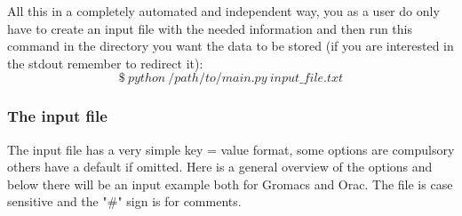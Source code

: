 		All this in a completely automated and independent way, you as a user do only have to create an input file with the needed information and then run this command in the directory you want the data to be stored (if you are interested in the stdout remember to redirect it):
		\[
		\$\ python\ /path/to/main.py\ input\_file.txt
		\]
		
		\subsubsection{The input file}
		
			The input file has a very simple key = value format, some options are compulsory others have a default if omitted. Here is a general overview of the options and below there will be an input example both for Gromacs\cite{gromacs_ABRAHAM201519} and Orac\cite{orac}. The file is case sensitive and the "\#" sign is for comments.
			
